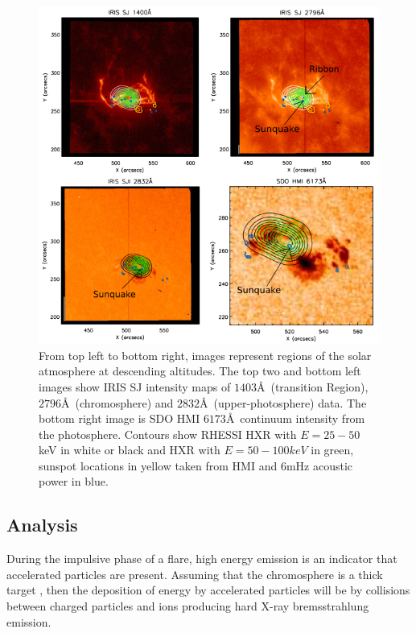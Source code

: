 \begin{figure}[H]
  \begin{center}
  \includegraphics[width=1.0\textwidth]{saxcontours-square}
  \end{center}
  \caption{From top left to bottom right, images represent regions of the solar atmosphere at descending altitudes. The top two and bottom left images show IRIS SJ intensity maps of $1403$\AA\ (transition Region), $2796$\AA\ (chromosphere) and $2832$\AA\ (upper-photosphere) data. The bottom right image is SDO HMI $6173$\AA\ continuum intensity from the photosphere. Contours show RHESSI HXR with $E = 25-50$ keV in white or black and HXR with $E = 50-100 keV$ in green, sunspot locations in yellow taken from HMI and 6mHz acoustic power in blue.}\label{saxcontours-vert}
\end{figure}


\subsection{Analysis}

During the impulsive phase of a flare, high energy emission is an indicator that accelerated particles are present. Assuming that the chromosphere is a thick target \citep{1971SoPh...18..489B}, then the deposition of energy by accelerated particles will be by collisions between charged particles and ions producing hard X-ray bremsstrahlung emission.
 
